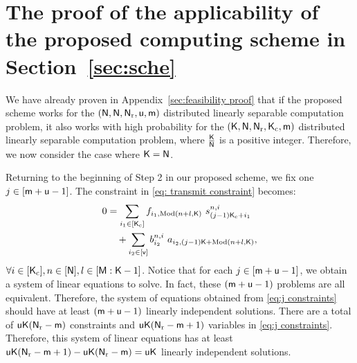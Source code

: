 \documentclass[conference,letterpaper]{IEEEtran}
\begin{document}
\section{The proof of the applicability of the proposed computing scheme in Section~\ref{sec:sche}}
\label{sec:applicability proof}
We have already proven in Appendix~\ref{sec:feasibility proof} that if the proposed scheme works for the \( ({\sf N}, {\sf N}, {\sf N}_{\rm r}, {\sf u}, {\sf m}) \) distributed linearly separable computation problem, it also works with high probability for the \( ({\sf K}, {\sf N}, {\sf N}_{\rm r}, {\sf K}_{\rm c}, {\sf m}) \) distributed linearly separable computation problem, where \( \frac{{\sf K}}{{\sf N}} \) is a positive integer. Therefore, we now consider the case where \( {\sf K} = {\sf N} \).

Returning to the beginning of Step 2 in our proposed scheme, we fix one \( j \in [{\sf m} + {\sf u} - 1] \). The constraint in \eqref{eq: transmit constraint} becomes:
\begin{align}
\begin{aligned}
0 &= \sum_{i_1 \in [\Ksf_{\rm c}]} f_{i_1, \text{Mod}(n+l, \Ksf)} \ s^{n,i}_{(j-1)\Ksf_{\rm c} + i_1} \\
&\quad + \sum_{i_2 \in [\vsf]} b^{n,i}_{i_2} \ a_{i_2, (j-1)\Ksf + \text{Mod}(n+l, \Ksf)},
\end{aligned}
\label{eq:j constraints}
\end{align}
\(\forall i \in [{\sf K}_{\rm c}], n \in [{\sf N}], l \in [{\sf M} : {\sf K} - 1]\).
Notice that for each \( j \in [{\sf m} + {\sf u} - 1] \), we obtain a system of linear equations to solve. In fact, these \( ( {\sf m} + {\sf u} - 1) \) problems are all equivalent. Therefore, the system of equations obtained from \eqref{eq:j constraints} should have at least \( ( {\sf m} + {\sf u} - 1 )\) linearly independent solutions. There are a total of \( {\sf u} {\sf K} ({\sf N}_{\rm r} - {\sf m}) \) constraints and \( {\sf u} {\sf K} ({\sf N}_{\rm r} - {\sf m} + 1) \) variables in \eqref{eq:j constraints}. Therefore, this system of linear equations has at least \( {\sf u} {\sf K} ({\sf N}_{\rm r} - {\sf m} + 1) - {\sf u} {\sf K} ({\sf N}_{\rm r} - {\sf m}) = {\sf u} {\sf K} \) linearly independent solutions.
\end{document}
